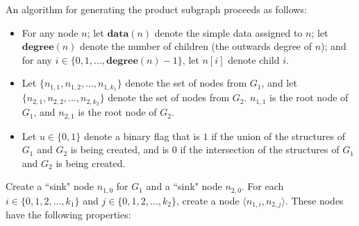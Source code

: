 \documentclass{article}
\begin{document}
An algorithm for generating the product subgraph proceeds as follows: 
\begin{itemize}
\item For any node \(n\); let \(\textbf{data}(n)\) denote the simple data assigned to \(n\); let \(\textbf{degree}(n)\) denote the number of children (the outwards degree of \(n\)); and for any \(i \in \{0,1,...,\textbf{degree}(n)-1\}\), let \(n[i]\) denote child \(i\). 
\item Let \(\{n_{1,1}, n_{1,2}, ..., n_{1,k_1}\}\) denote the set of nodes from \(G_1\), and let \(\{n_{2,1}, n_{2,2}, ..., n_{2,k_2}\}\) denote the set of nodes from \(G_2\). \(n_{1,1}\) is the root node of \(G_1\), and \(n_{2,1}\) is the root node of \(G_2\). 
\item Let \(u \in \{0,1\}\) denote a binary flag that is \(1\) if the union of the structures of \(G_1\) and \(G_2\) is being created, and is \(0\) if the intersection of the structures of \(G_1\) and \(G_2\) is being created.
\end{itemize}
Create a ``sink" node \(n_{1,0}\) for \(G_1\) and a ``sink" node \(n_{2,0}\). For each \(i \in \{0,1,2,...,k_1\}\) and \(j \in \{0,1,2,...,k_2\}\), create a node \(\langle n_{1,i}, n_{2,j}\rangle\). These nodes have the following properties:
\end{document}
